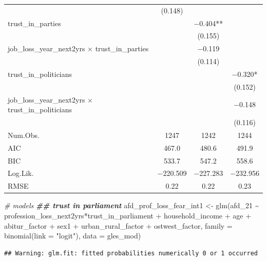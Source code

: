 \documentclass[
]{article}
\newenvironment{Shaded}{\begin{snugshade}}{\end{snugshade}}
\newcommand{\AttributeTok}[1]{\textcolor[rgb]{0.77,0.63,0.00}{#1}}
\newcommand{\CommentTok}[1]{\textcolor[rgb]{0.56,0.35,0.01}{\textit{#1}}}
\newcommand{\DocumentationTok}[1]{\textcolor[rgb]{0.56,0.35,0.01}{\textbf{\textit{#1}}}}
\newcommand{\FunctionTok}[1]{\textcolor[rgb]{0.00,0.00,0.00}{#1}}
\newcommand{\NormalTok}[1]{#1}
\newcommand{\OtherTok}[1]{\textcolor[rgb]{0.56,0.35,0.01}{#1}}
\newcommand{\SpecialCharTok}[1]{\textcolor[rgb]{0.00,0.00,0.00}{#1}}
\newcommand{\StringTok}[1]{\textcolor[rgb]{0.31,0.60,0.02}{#1}}
\begin{document}
\begin{table}
\begin{tabular}[t]{lccc}
 & (\num{0.148}) &  & \\
trust\_in\_parties &  & \num{-0.404}** & \\
 &  & (\num{0.155}) & \\
job\_loss\_year\_next2yrs × trust\_in\_parties &  & \num{-0.119} & \\
 &  & (\num{0.114}) & \\
trust\_in\_politicians &  &  & \num{-0.320}*\\
 &  &  & (\num{0.152})\\
job\_loss\_year\_next2yrs × trust\_in\_politicians &  &  & \num{-0.148}\\
 &  &  & (\num{0.116})\\
\midrule
Num.Obs. & \num{1247} & \num{1242} & \num{1244}\\
AIC & \num{467.0} & \num{480.6} & \num{491.9}\\
BIC & \num{533.7} & \num{547.2} & \num{558.6}\\
Log.Lik. & \num{-220.509} & \num{-227.283} & \num{-232.956}\\
RMSE & \num{0.22} & \num{0.22} & \num{0.23}\\
\bottomrule
\end{tabular}
\end{table}

\begin{Shaded}
\begin{Highlighting}[]
\CommentTok{\# models }
\DocumentationTok{\#\# trust in parliament}
\NormalTok{afd\_prof\_loss\_fear\_int1 }\OtherTok{\textless{}{-}} \FunctionTok{glm}\NormalTok{(afd\_21 }\SpecialCharTok{\textasciitilde{}}\NormalTok{ profession\_loss\_next2yrs}\SpecialCharTok{*}\NormalTok{trust\_in\_parliament }\SpecialCharTok{+}\NormalTok{ household\_income }\SpecialCharTok{+}\NormalTok{ age }\SpecialCharTok{+}\NormalTok{ abitur\_factor }\SpecialCharTok{+}\NormalTok{ sex1 }\SpecialCharTok{+}\NormalTok{ urban\_rural\_factor }\SpecialCharTok{+}\NormalTok{ ostwest\_factor, }
                             \AttributeTok{family =} \FunctionTok{binomial}\NormalTok{(}\AttributeTok{link =} \StringTok{"logit"}\NormalTok{),}
                             \AttributeTok{data =}\NormalTok{ gles\_mod)}
\end{Highlighting}
\end{Shaded}

\begin{verbatim}
## Warning: glm.fit: fitted probabilities numerically 0 or 1 occurred
\end{verbatim}
\end{document}
